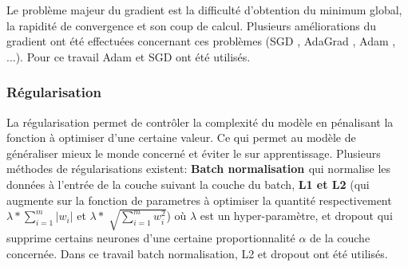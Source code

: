 Le problème majeur du gradient est la difficulté d'obtention du minimum global, la rapidité de convergence et son coup de calcul. Plusieurs améliorations du gradient ont été effectuées concernant ces problèmes (SGD \cite{sgd_}, AdaGrad \cite{adagrad}, Adam \cite{adam}, ...). Pour ce travail Adam et SGD ont été utilisés.


\subsubsection{Régularisation}
La régularisation permet de contrôler la complexité du modèle en pénalisant la fonction à optimiser d'une certaine valeur. Ce qui permet au modèle de généraliser mieux le monde concerné et éviter le sur apprentissage. Plusieurs méthodes de régularisations existent:
\textbf{Batch normalisation \cite{batch}} qui normalise les données à l'entrée de la couche suivant la couche du batch, \textbf{L1 et L2} (qui augmente sur la fonction de parametres à optimiser la quantité respectivement $\lambda * \sum \limits_{i = 1}^m |w_i|$ et  $\lambda * \sqrt[\,] {\sum \limits_{i = 1}^m w_i^2} $)
 où $\lambda$ est un hyper-paramètre, et dropout qui supprime certains neurones d'une certaine proportionnalité $\alpha$ de la couche concernée. Dans ce travail batch normalisation, L2 et dropout ont été utilisés.









